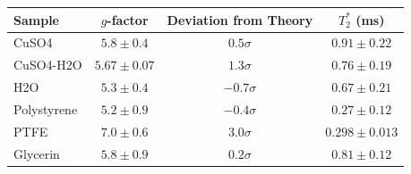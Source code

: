 \begin{tabular}{lccc}
\hline
Sample & $g$-factor & Deviation from Theory & $T_2^*$ (ms) \\
\hline
CuSO4 & $5.8 \pm 0.4$ & $0.5\sigma$ & $0.91 \pm 0.22$ \\
CuSO4-H2O & $5.67 \pm 0.07$ & $1.3\sigma$ & $0.76 \pm 0.19$ \\
H2O & $5.3 \pm 0.4$ & $-0.7\sigma$ & $0.67 \pm 0.21$ \\
Polystyrene & $5.2 \pm 0.9$ & $-0.4\sigma$ & $0.27 \pm 0.12$ \\
PTFE & $7.0 \pm 0.6$ & $3.0\sigma$ & $0.298 \pm 0.013$ \\
Glycerin & $5.8 \pm 0.9$ & $0.2\sigma$ & $0.81 \pm 0.12$ \\
\hline
\end{tabular}
